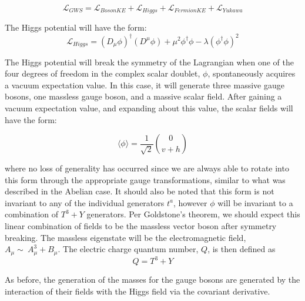 \begin{equation}\label{eq:ewk_lagrangian_simple}
\mathcal{L}_{GWS} = \mathcal{L}_{Boson KE} + \mathcal{L}_{Higgs} +
\mathcal{L}_{Fermion KE} + \mathcal{L}_{Yukawa} 
\end{equation}

\noindent The Higgs potential will have the form:
\begin{equation}\label{eq:ewk_higgs_lagrangian_term}
\mathcal{L}_{Higgs} = (D_{\mu}\phi)^{\dagger}(D^{\mu}\phi)
+\mu^{2}\phi^{\dagger}\phi - \lambda(\phi^{\dagger}\phi)^{2}
\end{equation}

\noindent The Higgs potential will break the symmetry of
the Lagrangian when one of the four degrees of freedom in the
complex scalar doublet, $\phi$, spontaneously acquires a
vacuum expectation value.  In this case, it will generate
three massive gauge bosons, one massless gauge boson, and a massive
scalar field.  After gaining a vacuum expectation value, and expanding
about this value, the scalar fields will have the form:

\begin{equation}\label{eq:ewk_phi_vev}
\langle\phi\rangle = \frac{1}{\sqrt{2}}\binom{0}{v+h}
\end{equation}

\noindent where no loss of generality has occurred since we are always
able to rotate into this form through the appropriate gauge
transformations, similar to what was described in the Abelian case.  It
should also be noted that this form is not invariant to any of the
individual generators $t^{a}$, however $\phi$ will be invariant to a
combination of $T^{3}+Y$ generators.  Per Goldstone's theorem, we
should expect this linear combination of fields to be the massless
vector boson after symmetry breaking.  The massless eigenstate will be
the electromagnetic field, $A_{\mu} \sim~A_{\mu}^{3} + B_{\mu}$.  The
electric charge quantum number, $Q$, is then defined as 
\begin{equation}\label{ewk_Q_quantum_number}
Q = T^{3}+Y
\end{equation}

\par As before, the generation of the masses for the gauge bosons are
generated by the interaction of their fields with the Higgs field via
the covariant derivative.  

